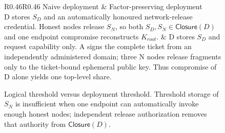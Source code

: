 \begin{figure}[t]
\centering
\small
\begin{tabular}{R{0.46\textwidth}R{0.46\textwidth}}
\toprule
Naive deployment & Factor-preserving deployment \\
\midrule
D stores $S_D$ and an automatically honoured network-release credential.
Honest nodes release $S_N$, so both $S_D,S_N\in\mathsf{Closure}(D)$ and one
endpoint compromise reconstructs $K_{root}$. &
D stores $S_D$ and request capability only. A signs the complete ticket from an
independently administered domain; three N nodes release fragments only to the
ticket-bound ephemeral public key. Thus compromise of D alone yields one
top-level share. \\
\bottomrule
\end{tabular}
\caption{Logical threshold versus deployment threshold. Threshold storage of
$S_N$ is insufficient when one endpoint can automatically invoke enough honest
nodes; independent release authorization removes that authority from
$\mathsf{Closure}(D)$.}
\label{fig:factor-collapse}
\end{figure}
